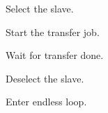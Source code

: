 \begin{DoxyEnumerate}
\item Select the slave. 
\begin{DoxyCodeInclude}{0}
\end{DoxyCodeInclude}

\item Start the transfer job. 
\begin{DoxyCodeInclude}{0}
\end{DoxyCodeInclude}

\item Wait for transfer done. 
\begin{DoxyCodeInclude}{0}
\end{DoxyCodeInclude}

\item Deselect the slave. 
\begin{DoxyCodeInclude}{0}
\end{DoxyCodeInclude}

\item Enter endless loop. 
\begin{DoxyCodeInclude}{0}
\end{DoxyCodeInclude}

\end{DoxyEnumerate}